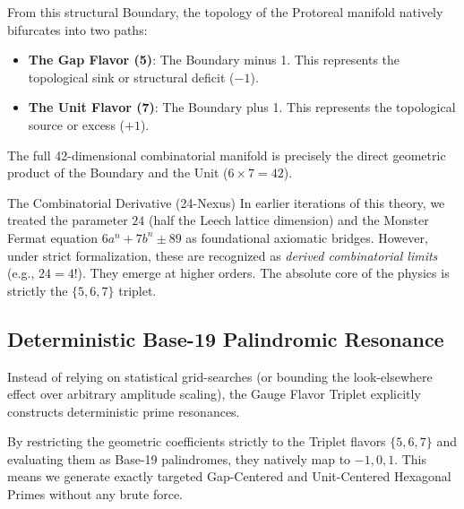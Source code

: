 From this structural Boundary, the topology of the Protoreal manifold natively bifurcates into two paths:
\begin{itemize}
    \item \textbf{The Gap Flavor (5)}: The Boundary minus 1. This represents the topological sink or structural deficit ($-1$).
    \item \textbf{The Unit Flavor (7)}: The Boundary plus 1. This represents the topological source or excess ($+1$).
\end{itemize}

The full 42-dimensional combinatorial manifold is precisely the direct geometric product of the Boundary and the Unit ($6 \times 7 = 42$).

\begin{theorembox}{The Combinatorial Derivative (24-Nexus)}
In earlier iterations of this theory, we treated the parameter $24$ (half the Leech lattice dimension) and the Monster Fermat equation $6a^n + 7b^n \pm 89$ as foundational axiomatic bridges. However, under strict formalization, these are recognized as \emph{derived combinatorial limits} (e.g., $24 = 4!$). They emerge at higher orders. The absolute core of the physics is strictly the $\{5, 6, 7\}$ triplet.
\end{theorembox}

\subsection{Deterministic Base-19 Palindromic Resonance}

Instead of relying on statistical grid-searches (or bounding the look-elsewhere effect over arbitrary amplitude scaling), the Gauge Flavor Triplet explicitly constructs deterministic prime resonances.

By restricting the geometric coefficients strictly to the Triplet flavors $\{5, 6, 7\}$ and evaluating them as Base-19 palindromes, they natively map to $-1, 0, 1$. This means we generate exactly targeted Gap-Centered and Unit-Centered Hexagonal Primes without any brute force.

